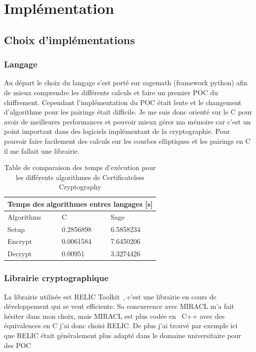 \chapter{Implémentation}
\label{ch:impl}

\section{Choix d'implémentations}
\subsection{Langage}
Au départ le choix du langage s'est porté sur sagemath (framework python) afin de mieux comprendre les différents calculs et faire un premier POC du chiffrement.
Cependant l'implémentation du POC était lente et le changement d'algorithme pour les pairings était difficile.
Je me suis donc orienté sur le C pour avoir de meilleures performances et pouvoir mieux gérer ma mémoire car c'est un point important dans des logiciels implémentant de la cryptographie. Pour pouvoir faire facilement des calculs sur les courbes elliptiques et les pairings en C il me fallait une librairie.

\begin{table}[h!]
	\centering
	\begin{tabular}{ |p{3cm}||p{3cm}|p{3cm}| }
		\hline
		\multicolumn{3}{|c|}{Temps des algorithmes entres langages [s]} \\
		\hline
		Algorithms& C &Sage\\
		\hline
		Setup   & 0.2856898 & 6.5858234\\
		Encrypt & 0.0061584 & 7.6450206\\
		Decrypt & 0.00951 & 3.3274426\\
		\hline
	\end{tabular}
\caption{Table de comparaison des temps d'exécution pour les différents algorithmes de Certificateless Cryptography }
\label{table:comparisonTimeAlgo}
\end{table}

\subsection{Librairie cryptographique}
La librairie utilisée est RELIC Toolkit~\cite{relic-toolkit}, c'est une librairie en cours de développement qui se veut efficiente. Sa concurrence avec MIRACL m'a fait hésiter dans mon choix, mais MIRACL est plus codée en~ C++ avec des équivalences en C j'ai donc choisi RELIC. De plus j'ai trouvé par exemple ici~\cite{bibid} que RELIC était généralement plus adapté dans le domaine universitaire pour des POC 
